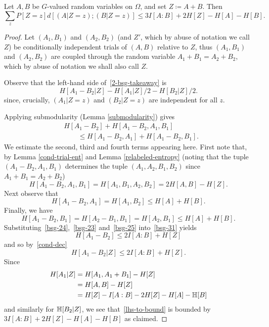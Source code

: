 \begin{lemma}\label{lem-bsg}
  Let $A,B$ be $G$-valued random variables on $\Omega$, and set $Z \coloneq A+B$.
Then
\begin{equation}\label{2-bsg-takeaway} \sum_{z} P[Z=z] d[(A | Z = z); (B | Z = z)] \leq 3 I[A:B] + 2 H[Z] - H[A] - H[B]. \end{equation}
\end{lemma}

\begin{proof}
Let $(A_1, B_1)$ and $(A_2, B_2)$ (and $Z'$, which by abuse of notation we call $Z$) be conditionally independent trials of $(A,B)$ relative to $Z$, thus $(A_1,B_1)$ and $(A_2,B_2)$ are coupled through the random variable $A_1 + B_1 = A_2 + B_2$, which by abuse of notation we shall also call $Z$.

Observe that the left-hand side of~\eqref{2-bsg-takeaway} is
\begin{equation}\label{lhs-to-bound}
H[A_1 - B_2| Z] - H[A_1 | Z]/2 - H[B_2 | Z]/2.
\end{equation}
since, crucially, $(A_1 | Z=z)$ and $(B_2 | Z=z)$ are independent for all $z$.

Applying submodularity (Lemma \ref{submodularity}) gives
\begin{equation}\label{bsg-31} \begin{split}
&H[A_1 - B_2] + H[A_1 - B_2, A_1, B_1] \\
&\qquad \leq H[A_1 - B_2, A_1] + H[A_1 - B_2,B_1].
\end{split}\end{equation}
We estimate the second, third and fourth terms appearing here.
First note that, by Lemma \ref{cond-trial-ent} and Lemma \ref{relabeled-entropy} (noting that the tuple $(A_1 - B_2, A_1, B_1)$  determines the tuple $(A_1, A_2, B_1, B_2)$ since $A_1+B_1=A_2+B_2$)
\begin{equation}\label{bsg-24} H[A_1 - B_2, A_1, B_1] = H[A_1, B_1, A_2, B_2] = 2H[A,B] - H[Z].\end{equation}
Next observe that
\begin{equation}\label{bsg-23} H[A_1 - B_2, A_1] = H[A_1, B_2] \leq H[A] + H[B].
\end{equation}
Finally, we have
\begin{equation}\label{bsg-25} H[A_1 - B_2, B_1] = H[A_2 - B_1, B_1] = H[A_2, B_1] \leq H[A] + H[B].\end{equation}
Substituting~\eqref{bsg-24},~\eqref{bsg-23} and~\eqref{bsg-25} into~\eqref{bsg-31} yields
\[ H[A_1 - B_2] \leq 2I[A:B] + H[Z]\] and so by~\eqref{cond-dec}
\[H[A_1 - B_2 | Z]  \leq 2I[A:B] + H[Z].\]
Since
\begin{align*} H[A_1 | Z] & = H[A_1, A_1 + B_1] - H[Z] \\ & = H[A,B] - H[Z] \\ & = H[Z] - I[A:B] - 2 H[Z]-H[A]-\mathbb{H}[B]\end{align*}
and similarly for $\mathbb{H}[B_2 | Z]$, we see that~\eqref{lhs-to-bound} is bounded by
$3I[A:B] + 2H[Z]-H[A]-H[B]$ as claimed.
\end{proof}
